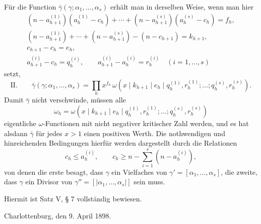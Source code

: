 \documentclass[11pt,a4paper]{article}
\begin{document}
Für die Function $\bar\gamma(\gamma;\alpha_1,
\ldots,\alpha_s)$ erhält man in derselben Weise, wenn man hier
\[
\begin{gathered}
 (n-a_{h+1}^{(1)})(a_h^{(1)}-c_h)+\cdots+(n-a_{h+1}^{(s)})(a_h^{(s)}-c_h)=f_h,\\
 (n-a_{h+1}^{(1)})+\cdots+(n-a_{h+1}^{(s)})-(n-c_{h+1})=k_{h+1},\\
 c_{h+1}-c_h=e_h,\\
 a_{h+1}^{(i)}-c_h=q_h^{(i)},
 \qquad a_{h+1}^{(i)}-a_h^{(i)}=r_h^{(i)}\quad(i=1,\ldots,s)
\end{gathered}
\]
setzt,
\[
\text{II.}\qquad
 \bar\gamma(\gamma;\alpha_1,
\ldots,\alpha_s)=\prod_h x^{f_h}\,
 \omega(x\mid k_{h+1}\mid e_h\mid q_h^{(1)},r_h^{(1)};\ldots;q_h^{(s)},r_h^{(s)}).
\]
Damit $\bar\gamma$ nicht verschwinde, müssen alle
\[
 \omega_h=\omega(x\mid k_{h+1}\mid e_h\mid q_h^{(1)},r_h^{(1)};\ldots;q_h^{(s)},r_h^{(s)})
\]
eigentliche $\omega$-Functionen mit nicht negativer kritischer Zahl werden, und es hat alsdann $\bar\gamma$ für jedes $x>1$ einen positiven Werth. Die nothwendigen und hinreichenden Bedingungen hierfür werden dargestellt durch die Relationen
\[
 c_h\le a_h^{(i)},
 \qquad
 c_h\ge n-\sum_{i=1}^s(n-a_h^{(i)}),
\]
von denen die erste besagt, dass $\gamma$ ein Vielfaches von $\gamma'=[\alpha_1,
\ldots,\alpha_s]$, die zweite, dass $\gamma$ ein Divisor von $\gamma''=[|\alpha_1,
\ldots,\alpha_s|]$ sein muss.

Hiermit ist Satz V, § 7 vollständig bewiesen.

Charlottenburg, den 9. April 1898.
\end{document}
